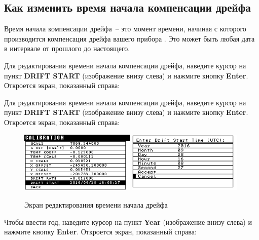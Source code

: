 \subsection{Как изменить время начала компенсации дрейфа}

Время начала компенсации дрейфа~-- это момент времени, начиная с которого
производится компенсация дрейфа вашего прибора \cg{}. Это может быть любая дата в
интервале от прошлого до настоящего.

Для редактирования времени начала компенсации дрейфа, наведите курсор на пункт
\textbf{DRIFT START} (изображение внизу слева) и нажмите кнопку \textbf{Enter}.
Откроется экран, показанный справа:


Для редактирования времени начала компенсации дрейфа, наведите курсор на пункт
\textbf{DRIFT START} (изображение внизу слева) и нажмите кнопку \textbf{Enter}.
Откроется экран, показанный справа:

\begin{figure}[H]
  \centering
  \includegraphics[width=0.49\textwidth]{figures/the_drift_start_time_editing_screen_1}
  \includegraphics[width=0.49\textwidth]{figures/the_drift_start_time_editing_screen_2}
  \caption{Экран редактирования времени начала дрейфа}
  \label{fig:the_drift_start_time_editing_screen}
\end{figure}

Чтобы ввести год, наведите курсор на пункт \textbf{Year} (изображение внизу слева) и
нажмите кнопку \textbf{Enter}. Откроется экран, показанный справа:

